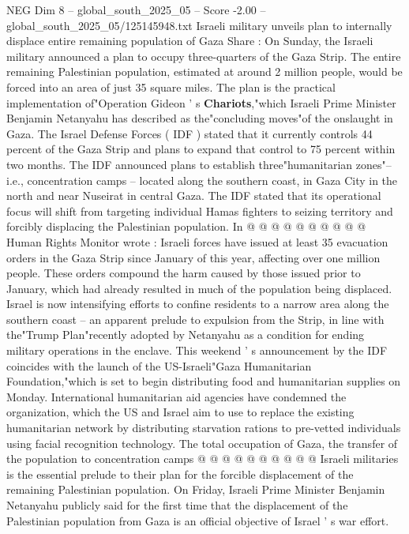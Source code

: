 \begin{textsample}{NEG Dim 8 – global\_south\_2025\_05 – Score -2.00 – global\_south\_2025\_05/125145948.txt}  \label{ex:f8_neg_007}
Israeli military unveils plan to internally displace entire remaining population of Gaza Share : On Sunday, the Israeli military announced a plan to occupy three-quarters of the Gaza Strip.
The entire remaining Palestinian population, estimated at around 2 million people, would be forced into an area of just 35 square miles.
The plan is the practical implementation of"Operation Gideon ' s \textbf{Chariots},"which Israeli Prime Minister Benjamin Netanyahu has described as the"concluding moves"of the onslaught in Gaza.
The Israel Defense Forces ( IDF ) stated that it currently controls 44 percent of the Gaza Strip and plans to expand that control to 75 percent within two months.
The IDF announced plans to establish three"humanitarian zones"-- i.e., concentration camps -- located along the southern coast, in Gaza City in the north and near Nuseirat in central Gaza.
The IDF stated that its operational focus will shift from targeting individual Hamas fighters to seizing territory and forcibly displacing the Palestinian population.
In @ @ @ @ @ @ @ @ @ @ Human Rights Monitor wrote : Israeli forces have issued at least 35 evacuation orders in the Gaza Strip since January of this year, affecting over one million people.
These orders compound the harm caused by those issued prior to January, which had already resulted in much of the population being displaced.
Israel is now intensifying efforts to confine residents to a narrow area along the southern coast -- an apparent prelude to expulsion from the Strip, in line with the"Trump Plan"recently adopted by Netanyahu as a condition for ending military operations in the enclave.
This weekend ' s announcement by the IDF coincides with the launch of the US-Israeli"Gaza Humanitarian Foundation,"which is set to begin distributing food and humanitarian supplies on Monday.
International humanitarian aid agencies have condemned the organization, which the US and Israel aim to use to replace the existing humanitarian network by distributing starvation rations to pre-vetted individuals using facial recognition technology.
The total occupation of Gaza, the transfer of the population to concentration camps @ @ @ @ @ @ @ @ @ @ Israeli militaries is the essential prelude to their plan for the forcible displacement of the remaining Palestinian population.
On Friday, Israeli Prime Minister Benjamin Netanyahu publicly said for the first time that the displacement of the Palestinian population from Gaza is an official objective of Israel ' s war effort.

\end{textsample}
